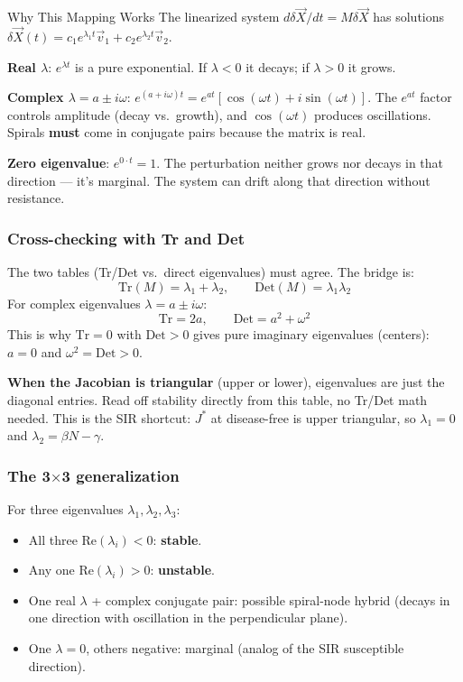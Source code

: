 \documentclass[11pt]{article}
\begin{document}
\begin{intuitionbox}{Why This Mapping Works}
The linearized system $d\delta\vec X/dt = M \delta\vec X$ has solutions $\delta\vec X(t) = c_1 e^{\lambda_1 t}\vec v_1 + c_2 e^{\lambda_2 t}\vec v_2$.

\textbf{Real $\lambda$}: $e^{\lambda t}$ is a pure exponential. If $\lambda < 0$ it decays; if $\lambda > 0$ it grows.

\textbf{Complex $\lambda = a \pm i\omega$}: $e^{(a+i\omega)t} = e^{at}[\cos(\omega t) + i\sin(\omega t)]$. The $e^{at}$ factor controls amplitude (decay vs.\ growth), and $\cos(\omega t)$ produces oscillations. Spirals \textbf{must} come in conjugate pairs because the matrix is real.

\textbf{Zero eigenvalue}: $e^{0\cdot t} = 1$. The perturbation neither grows nor decays in that direction --- it's marginal. The system can drift along that direction without resistance.
\end{intuitionbox}

\subsubsection{Cross-checking with Tr and Det}

The two tables (Tr/Det vs.\ direct eigenvalues) must agree. The bridge is:
\[
\text{Tr}(M) = \lambda_1 + \lambda_2, \qquad \text{Det}(M) = \lambda_1 \lambda_2
\]
For complex eigenvalues $\lambda = a \pm i\omega$:
\[
\text{Tr} = 2a, \qquad \text{Det} = a^2 + \omega^2
\]
This is why $\text{Tr} = 0$ with $\text{Det} > 0$ gives pure imaginary eigenvalues (centers): $a = 0$ and $\omega^2 = \text{Det} > 0$.

\begin{tipbox}
\textbf{When the Jacobian is triangular} (upper or lower), eigenvalues are just the diagonal entries. Read off stability directly from this table, no Tr/Det math needed. This is the SIR shortcut: $J^*$ at disease-free is upper triangular, so $\lambda_1 = 0$ and $\lambda_2 = \beta N - \gamma$.
\end{tipbox}

\subsubsection{The 3$\times$3 generalization}

For three eigenvalues $\lambda_1, \lambda_2, \lambda_3$:
\begin{itemize}
\item All three $\text{Re}(\lambda_i) < 0$: \textbf{stable}.
\item Any one $\text{Re}(\lambda_i) > 0$: \textbf{unstable}.
\item One real $\lambda$ + complex conjugate pair: possible spiral-node hybrid (decays in one direction with oscillation in the perpendicular plane).
\item One $\lambda = 0$, others negative: marginal (analog of the SIR susceptible direction).
\end{itemize}
\end{document}
